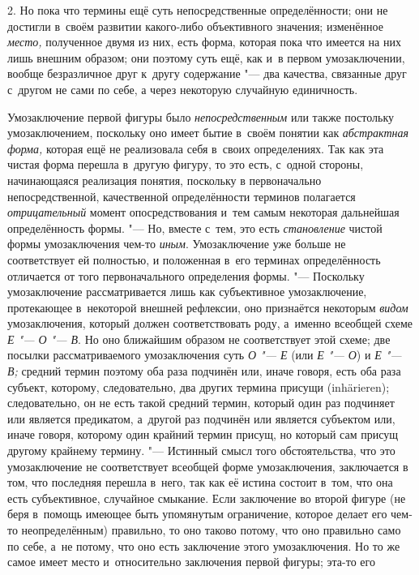2. Но пока что термины ещё суть непосредственные
определённости; они не достигли в~своём развитии какого-либо объективного
значения; изменённое {\em место,}
полученное двумя из них, есть форма, которая пока что имеется
на них лишь внешним образом; они поэтому суть ещё, как и~в
первом умозаключении, вообще безразличное друг к~другу содержание
"--- два качества, связанные друг с~другом не сами по себе, а
через некоторую случайную единичность.

Умозаключение первой фигуры было {\em непосредственным}
или также постольку умозаключением, поскольку оно имеет бытие
в~своём понятии как {\em абстрактная
форма,} которая ещё не реализовала себя в~своих
определениях. Так как эта чистая форма перешла в~другую фигуру, то это
есть, с~одной стороны, начинающаяся реализация понятия, поскольку в
первоначально непосредственной, качественной определённости терминов
полагается {\em отрицательный}
момент опосредствования и~тем самым некоторая дальнейшая
определённость формы. "--- Но, вместе с~тем, это есть
{\em становление} чистой формы умозаключения чем-то {\em иным}.
Умозаключение уже больше не соответствует ей полностью, и
положенная в~его терминах определённость отличается от того первоначального
определения формы. "--- Поскольку умозаключение рассматривается
лишь как субъективное умозаключение, протекающее в~некоторой внешней
рефлексии, оно признаётся некоторым {\em видом}
умозаключения, который должен соответствовать роду, а~именно
всеобщей схеме {\em Е "--- О "--- В}. Но оно ближайшим
образом не соответствует этой схеме; две посылки рассматриваемого
умозаключения суть {\em О "--- Е} (или {\em Е "--- О}) и
{\em Е "--- В;} средний термин поэтому оба раза подчинён
или, иначе говоря, есть оба раза субъект, которому, следовательно, два
других термина присущи (inhärieren); следовательно, он не
есть такой средний термин, который один раз подчиняет или является
предикатом, а~другой раз подчинён или является субъектом или, иначе говоря,
которому один крайний термин присущ, но который сам присущ другому крайнему
термину. "--- Истинный смысл того обстоятельства, что это
умозаключение не соответствует всеобщей форме умозаключения, заключается в
том, что последняя перешла в~него, так как её истина состоит в~том, что она
есть субъективное, случайное смыкание. Если заключение во второй фигуре (не
беря в~помощь имеющее быть упомянутым ограничение, которое делает его
чем-то неопределённым) правильно, то оно таково потому, что оно правильно
само по себе, а~не потому, что оно есть заключение этого умозаключения. Но
то же самое имеет место и~относительно заключения первой фигуры; эта-то его
